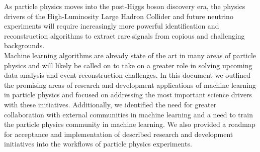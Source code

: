 As particle physics moves into the post-Higgs boson discovery era, the physics drivers of the High-Luminosity Large Hadron Collider and future neutrino experiments will require increasingly more powerful identification and reconstruction algorithms to extract rare signals from copious and challenging backgrounds.\\

Machine learning algorithms are already state of the art in many areas of particle physics and will likely be called on to take on a greater role in solving upcoming data analysis and event reconstruction challenges.
In this document we outlined the promising areas of research and development applications of machine learning in particle physics and focused on addressing the most important science drivers with these initiatives.
Additionally, we identified the need for greater collaboration with external communities in machine learning and a need to train the particle physics community in machine learning.
We also provided a roadmap for acceptance and implementation of described research and development initiatives into the workflows of particle physics experiments.
